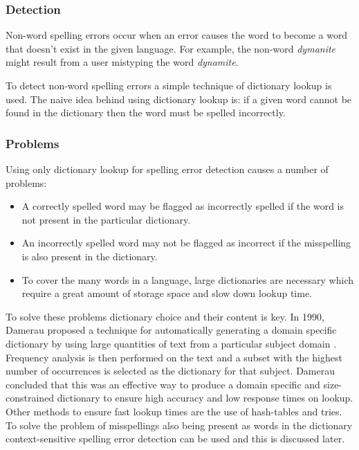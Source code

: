 \subsubsection{Detection}

Non-word spelling errors occur when an error causes the word to become a word that doesn't exist in the given language. For example, the non-word \emph{dymanite} might result from a user mistyping the word \emph{dynamite}.

To detect non-word spelling errors a simple technique of dictionary lookup is used. The naive idea behind using dictionary lookup is: if a given word cannot be found in the dictionary then the word must be spelled incorrectly.

\subsubsection{Problems}

Using only dictionary lookup for spelling error detection causes a number of problems: 

\begin{itemize}
\item
A correctly spelled word may be flagged as incorrectly spelled if the word is not present in the particular dictionary.
\item
An incorrectly spelled word may not be flagged as incorrect if the misspelling is also present in the dictionary.
\item
To cover the many words in a language, large dictionaries are necessary which require a great amount of storage space and slow down lookup time.
\end{itemize} 

To solve these problems dictionary choice and their content is key. In 1990, Damerau proposed a technique for automatically generating a domain specific dictionary by using large quantities of text from a particular subject domain \cite{Damerau1990}. Frequency analysis is then performed on the text and a subset with the highest number of occurrences is selected as the dictionary for that subject. Damerau concluded that this was an effective way to produce a domain specific and size-constrained dictionary to ensure high accuracy and low response times on lookup. Other methods to ensure fast lookup times are the use of hash-tables and tries. To solve the problem of misspellings also being present as words in the dictionary context-sensitive spelling error detection can be used and this is discussed later.


